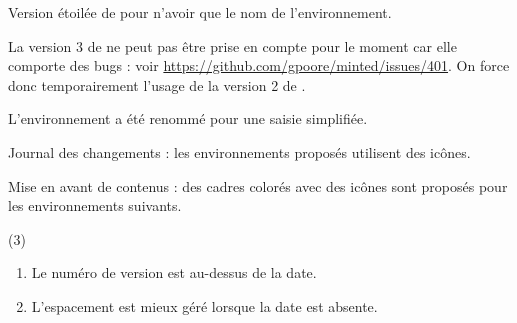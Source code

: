 \tdocsep




\begin{tdocnew}[version = 1.3.1, date = 2024-09-26]
    \item Version étoilée de  pour n'avoir que le nom de l'environnement.
\end{tdocnew}

\tdocsep




\begin{tdoctech}[version = 1.3.0, date = 2024-09-25]
    \item La version 3 de  ne peut pas être prise en compte pour le moment car elle comporte des bugs : voir \url{https://github.com/gpoore/minted/issues/401}. On force donc temporairement l'usage de la version 2 de .
\end{tdoctech}


\begin{tdocbreak}
    \item L'environnement  a été renommé  pour une saisie simplifiée.
\end{tdocbreak}


\begin{tdocnew}
    \item Journal des changements : les environnements proposés utilisent des icônes.


    \item Mise en avant de contenus : des cadres colorés avec des icônes sont proposés pour les environnements suivants.
    \begin{tasks}[label=\arabic*.](3)
        \task {}
        \task {}
        \task {}
        \task {}
        \task {}
    \end{tasks}
\end{tdocnew}

\tdocsep




\begin{tdocupdate}[version = 1.2.0-a, date = 2024-08-23]
    \item {}
    \begin{enumerate}
        \item Le numéro de version est au-dessus de la date.

        \item L'espacement est mieux géré lorsque la date est absente.
    \end{enumerate}
\end{tdocupdate}


